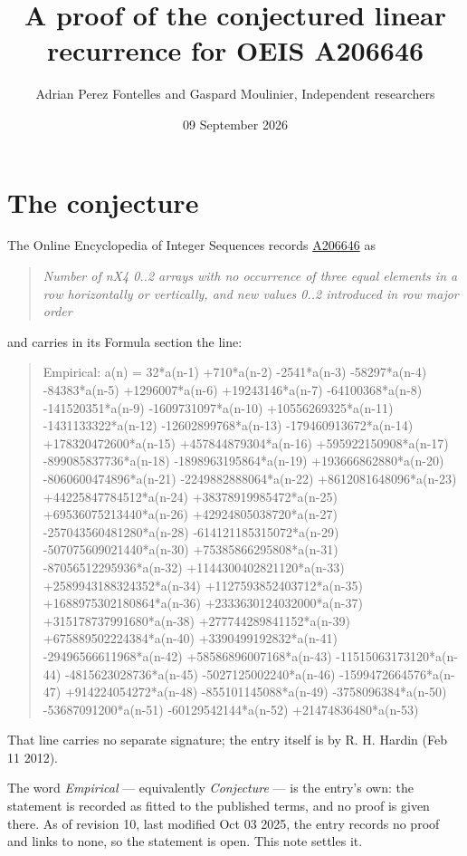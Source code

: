 \documentclass[11pt]{article}
\title{A proof of the conjectured linear recurrence for OEIS A206646}
\author{Adrian Perez Fontelles and Gaspard Moulinier, Independent researchers}
\date{09 September 2026}
\theoremstyle{definition}
\begin{document}
\maketitle
\section{The conjecture}

The Online Encyclopedia of Integer Sequences records \href{https://oeis.org/A206646}{A206646} as

\begin{quote}\itshape Number of nX4 0..2 arrays with no occurrence of three equal elements in a row horizontally or vertically, and new values 0..2 introduced in row major order\end{quote}

and carries in its Formula section the line:

\begin{quote}\ttfamily Empirical: a(n) = 32*a(n-1) +710*a(n-2) -2541*a(n-3) -58297*a(n-4) -84383*a(n-5) +1296007*a(n-6) +19243146*a(n-7) -64100368*a(n-8) -141520351*a(n-9) -1609731097*a(n-10) +10556269325*a(n-11) -1431133322*a(n-12) -12602899768*a(n-13) -179460913672*a(n-14) +178320472600*a(n-15) +457844879304*a(n-16) +595922150908*a(n-17) -899085837736*a(n-18) -1898963195864*a(n-19) +193666862880*a(n-20) -8060600474896*a(n-21) -2249882888064*a(n-22) +8612081648096*a(n-23) +44225847784512*a(n-24) +38378919985472*a(n-25) +69536075213440*a(n-26) +42924805038720*a(n-27) -257043560481280*a(n-28) -614121185315072*a(n-29) -507075609021440*a(n-30) +75385866295808*a(n-31) -87056512295936*a(n-32) +1144300402821120*a(n-33) +2589943188324352*a(n-34) +1127593852403712*a(n-35) +1688975302180864*a(n-36) +2333630124032000*a(n-37) +315178737991680*a(n-38) +277744289841152*a(n-39) +675889502224384*a(n-40) +3390499192832*a(n-41) -29496566611968*a(n-42) +58586896007168*a(n-43) -11515063173120*a(n-44) -4815623028736*a(n-45) -5027125002240*a(n-46) -1599472664576*a(n-47) +914224054272*a(n-48) -855101145088*a(n-49) -3758096384*a(n-50) -53687091200*a(n-51) -60129542144*a(n-52) +21474836480*a(n-53)\end{quote}

That line carries no separate signature; the entry itself is by R. H. Hardin (Feb 11 2012).

The word {\itshape Empirical} --- equivalently {\itshape Conjecture} --- is the entry's own: the statement is recorded as fitted to the published terms, and no proof is given there. As of revision 10, last modified Oct 03 2025, the entry records no proof and links to none, so the statement is open. This note settles it.
\end{document}
